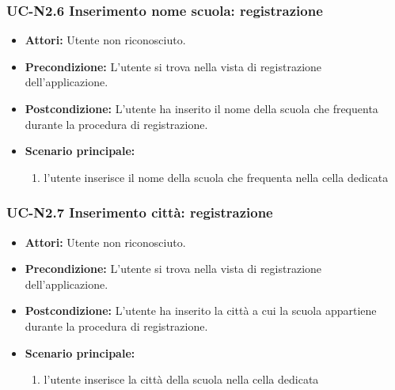 \subsubsection{UC-N2.6 Inserimento nome scuola: registrazione}
\begin{itemize}
	\item \textbf{Attori: }Utente non riconosciuto.
	\item \textbf{Precondizione: }L'utente si trova nella vista 		di registrazione dell'applicazione.
	\item \textbf{Postcondizione: }L'utente ha inserito il nome della scuola che frequenta durante la procedura di registrazione.
	\item \textbf{Scenario principale: }
	\begin{enumerate}
		\item l'utente inserisce il nome della scuola che frequenta nella cella dedicata
	\end{enumerate}
\end{itemize}

\subsubsection{UC-N2.7 Inserimento città: registrazione}
\begin{itemize}
	\item \textbf{Attori: }Utente non riconosciuto.
	\item \textbf{Precondizione: }L'utente si trova nella vista 		di registrazione dell'applicazione.
	\item \textbf{Postcondizione: }L'utente ha inserito la città a cui la scuola appartiene durante la procedura di registrazione.
	\item \textbf{Scenario principale: }
	\begin{enumerate}
		\item l'utente inserisce la città della scuola nella cella dedicata
	\end{enumerate}
\end{itemize}


